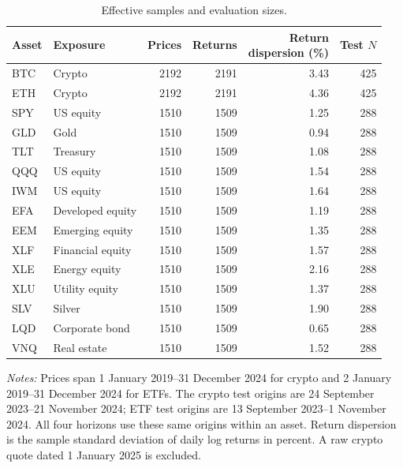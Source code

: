 \begin{table}[tbp]
\centering\small
\setlength{\tabcolsep}{4pt}
\renewcommand{\arraystretch}{1.12}
\caption{Effective samples and evaluation sizes.}
\label{tab:sample}
\begin{tabular}{llrrrr}
\toprule
Asset & Exposure & Prices & Returns & \shortstack{Return\\dispersion (\%)} & Test $N$ \\
\midrule
BTC & Crypto & 2192 & 2191 & 3.43 & 425 \\
ETH & Crypto & 2192 & 2191 & 4.36 & 425 \\
SPY & US equity & 1510 & 1509 & 1.25 & 288 \\
GLD & Gold & 1510 & 1509 & 0.94 & 288 \\
TLT & Treasury & 1510 & 1509 & 1.08 & 288 \\
QQQ & US equity & 1510 & 1509 & 1.54 & 288 \\
IWM & US equity & 1510 & 1509 & 1.64 & 288 \\
EFA & Developed equity & 1510 & 1509 & 1.19 & 288 \\
EEM & Emerging equity & 1510 & 1509 & 1.35 & 288 \\
XLF & Financial equity & 1510 & 1509 & 1.57 & 288 \\
XLE & Energy equity & 1510 & 1509 & 2.16 & 288 \\
XLU & Utility equity & 1510 & 1509 & 1.37 & 288 \\
SLV & Silver & 1510 & 1509 & 1.90 & 288 \\
LQD & Corporate bond & 1510 & 1509 & 0.65 & 288 \\
VNQ & Real estate & 1510 & 1509 & 1.52 & 288 \\
\bottomrule
\end{tabular}
\par\smallskip
\begin{minipage}{0.98\linewidth}\footnotesize
\textit{Notes:} Prices span 1 January 2019--31 December 2024 for crypto and 2 January 2019--31 December 2024 for ETFs. The crypto test origins are 24 September 2023--21 November 2024; ETF test origins are 13 September 2023--1 November 2024. All four horizons use these same origins within an asset. Return dispersion is the sample standard deviation of daily log returns in percent. A raw crypto quote dated 1 January 2025 is excluded.
\end{minipage}
\end{table}
